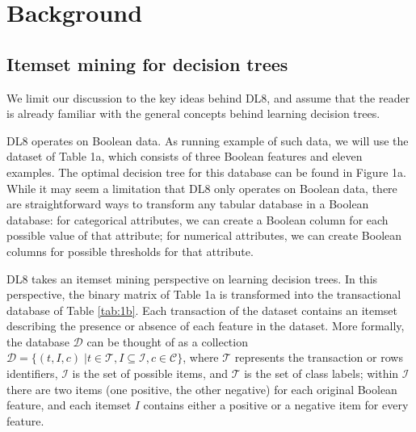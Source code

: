 \section{Background}
\subsection{Itemset mining for decision trees}
We limit our discussion to the key ideas behind DL8, and assume that the reader is already familiar with the general concepts behind learning decision trees.

DL8 operates on Boolean data. As running example of such data, we will use the dataset of Table 1a, which consists of three Boolean features and eleven examples. The optimal decision tree for this database can be found in Figure 1a. While it may seem a limitation that DL8 only operates on Boolean data, there are straightforward ways to transform any tabular database in a Boolean database: for categorical attributes, we can create a Boolean column for each possible value of that attribute; for numerical attributes, we can create Boolean columns for possible thresholds for that attribute.

DL8 takes an itemset mining perspective on learning decision trees. In this perspective, the binary matrix of Table 1a is transformed into the transactional database of Table \ref{tab:1b}. Each transaction of the dataset contains an itemset describing the presence or absence of each feature in the dataset. More formally, the database $\mathcal{D}$ can be thought of as a collection $\mathcal{D} = \{(t, I, c)\;|t\in \mathcal{T} , I \subseteq \mathcal{I}, c \in \mathcal{C}\}$, where $\mathcal{T}$ represents the transaction or rows identifiers, $\mathcal{I}$ is the set of possible items, and $\mathcal{T}$ is the set of class labels; within $\mathcal{I}$ there are two items (one positive, the other negative) for each original Boolean feature, and each itemset $I$ contains either a positive or a negative item for every feature.

